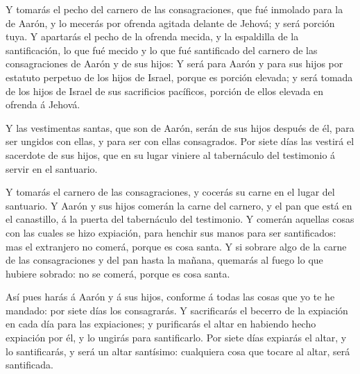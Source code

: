  Y tomarás el pecho del carnero de las consagraciones, que
fué inmolado para la de Aarón, y lo mecerás por ofrenda agitada delante
de Jehová; y será porción tuya.  Y apartarás el pecho de la
ofrenda mecida, y la espaldilla de la santificación, lo que fué mecido y
lo que fué santificado del carnero de las consagraciones de Aarón y de
sus hijos:  Y será para Aarón y para sus hijos por estatuto
perpetuo de los hijos de Israel, porque es porción elevada; y será
tomada de los hijos de Israel de sus sacrificios pacíficos, porción de
ellos elevada en ofrenda á Jehová.

 Y las vestimentas santas, que son de Aarón, serán de sus
hijos después de él, para ser ungidos con ellas, y para ser con ellas
consagrados.  Por siete días las vestirá el sacerdote de
sus hijos, que en su lugar viniere al tabernáculo del testimonio á
servir en el santuario.

 Y tomarás el carnero de las consagraciones, y cocerás su
carne en el lugar del santuario.  Y Aarón y sus hijos
comerán la carne del carnero, y el pan que está en el canastillo, á la
puerta del tabernáculo del testimonio.  Y comerán aquellas
cosas con las cuales se hizo expiación, para henchir sus manos para ser
santificados: mas el extranjero no comerá, porque es cosa santa.
 Y si sobrare algo de la carne de las consagraciones y del
pan hasta la mañana, quemarás al fuego lo que hubiere sobrado: no se
comerá, porque es cosa santa.

 Así pues harás á Aarón y á sus hijos, conforme á todas las
cosas que yo te he mandado: por siete días los consagrarás.
 Y sacrificarás el becerro de la expiación en cada día para
las expiaciones; y purificarás el altar en habiendo hecho expiación por
él, y lo ungirás para santificarlo.  Por siete días
expiarás el altar, y lo santificarás, y será un altar santísimo:
cualquiera cosa que tocare al altar, será santificada.

